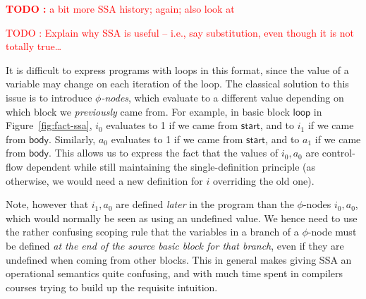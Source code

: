 \documentclass[acmsmall,screen,review]{acmart}
\newcounter{todos}
\newcommand{\TODO}[1]{{
  \stepcounter{todos}
  \begin{center}\large{\textcolor{red}{\textbf{TODO \arabic{todos}:} #1}}\end{center}
}}
\newcommand{\todo}[1]{\stepcounter{todos} \textcolor{red}{TODO \arabic{todos}: #1}}
\newcommand{\ms}[1]{\ensuremath{\mathsf{#1}}}
\begin{document}
\TODO{a bit more SSA history; \citet{ssa-intro} again; also look at \citet{ssa-original}}

\todo{Explain why SSA is useful -- i.e., say substitution, even though it is not totally true\ldots}

It is difficult to express programs with loops in this format, since the value of a
variable may change on each iteration of the loop. The classical solution to this issue is to
introduce \textit{$\phi$-nodes}, which evaluate to a different value depending on which block we
\textit{previously} came from. For example, in basic block \ms{loop} in
Figure~\ref{fig:fact-ssa}, $i_0$ evaluates to 1 if we came from \ms{start}, and to $i_1$ if we
came from \ms{body}. Similarly, $a_0$ evaluates to 1 if we came from \ms{start}, and to $a_1$ if we
came from \ms{body}. This allows us to express the fact that the values of $i_0, a_0$ are
control-flow dependent while still maintaining the single-definition principle (as otherwise, we
would need a new definition for $i$ overriding the old one).

Note, however that $i_1, a_0$ are defined \textit{later} in the program than the
$\phi$-nodes $i_0, a_0$, which would normally be seen as using an undefined
value. We hence need to use the rather confusing scoping rule that the variables
in a branch of a $\phi$-node must be defined \textit{at the end of the source
basic block for that branch}, even if they are undefined when coming from other blocks. This in
general makes giving SSA an operational semantics quite confusing, and with much
time spent in compilers courses trying to build up the requisite intuition.
\end{document}
